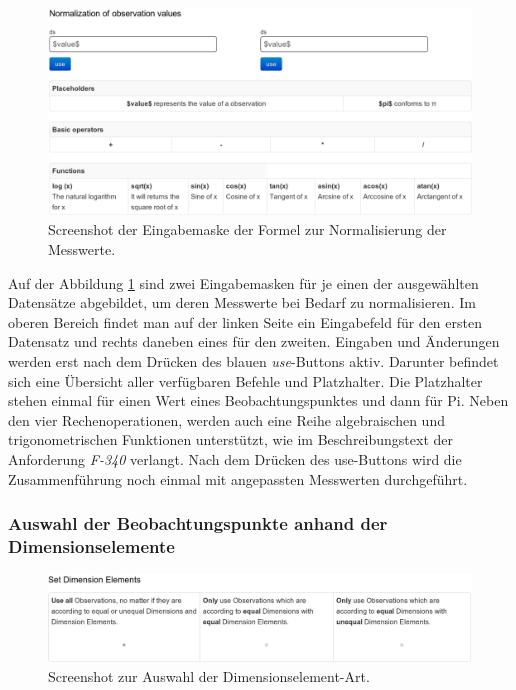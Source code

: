 \documentclass[11pt]{article}
\newcommand{\com}[1]{\marginpar{\em {\small{#1}}}} %
\begin{document}
%
%
\begin{figure}[h!]
    \centering
    \includegraphics[width=14.3cm]{UserInterfaceMergeDatasets/NormalizationUserInterface.pdf}
    \caption{Screenshot der Eingabemaske der Formel zur Normalisierung der Messwerte.}
    \label{fig:UserInterfaceMergeDatasets_NormalizationUserInterface}
\end{figure}

\noindent
Auf der Abbildung \ref{fig:UserInterfaceMergeDatasets_NormalizationUserInterface} sind zwei Eingabemasken für je einen der ausgewählten Datensätze abgebildet, um deren Messwerte bei Bedarf zu normalisieren. Im oberen Bereich findet man auf der linken Seite ein Eingabefeld für den ersten Datensatz und rechts daneben eines für den zweiten. Eingaben und Änderungen werden erst nach dem Drücken des blauen \textit{use}-Buttons aktiv. Darunter befindet sich eine Übersicht aller verfügbaren Befehle und Platzhalter. Die Platzhalter stehen einmal für einen Wert eines Beobachtungspunktes und dann für Pi. Neben den vier Rechenoperationen, werden auch eine Reihe algebraischen und trigonometrischen Funktionen unterstützt,\com{Anforderung \\ F-340, S. \pageref{req:F340}} wie im Beschreibungstext der Anforderung \textit{F-340} verlangt. Nach dem Drücken des use-Buttons wird die Zusammenführung noch einmal mit angepassten Messwerten durchgeführt. 


%
%
\subsubsection{Auswahl der Beobachtungspunkte anhand der Dimensionselemente}

%
%
\begin{figure}[h!]
    \centering
    \includegraphics[width=15cm]{UserInterfaceMergeDatasets/DimensionelementSelectionUserInterface.pdf}
    \caption{Screenshot zur Auswahl der Dimensionselement-Art.}
    \label{fig:UserInterfaceMergeDatasets_DimensionelementSelectionUserInterface}
\end{figure}
\end{document}
